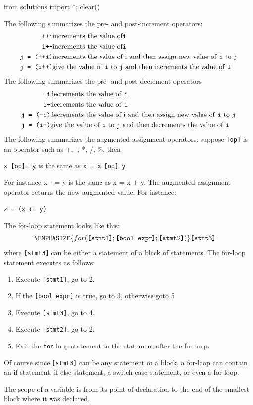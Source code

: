 \begin{python0}
from solutions import *; clear()
\end{python0}

The following summarizes the pre- and post-increment operators:
\begin{align*}
\texttt{++i} &\text{increments the value of} \texttt{i}\\
\texttt{i++} &\text{increments the value of} \texttt{i}\\
\texttt{j = (++i)} &\text{increments the value of i and then assign new value of
\texttt{i} to \texttt{j}}\\
\texttt{j = (i++)} &\text{give the value of \texttt{i} to \texttt{j} and then
increments the value of \texttt{I}}\\
\end{align*}
The following summarizes the pre- and post-decrement operators
\begin{align*}
\texttt{--i} &\text{decrements the value of \texttt{i}}\\
\texttt{i--} &\text{decrements the value of \texttt{i}}\\
\texttt{j = (--i)} &\text{decrements the value of i and then assign new value
of \texttt{i} to \texttt{j}}\\
\texttt{j = (i--)} &\text{give the value of \texttt{i} to \texttt{j} and then
decrements the value of \texttt{i}}\\
\end{align*}
The following summarizes the augmented assignment operators: suppose
\texttt{[op]} is an operator such as +, -, *, /, \%, then
\begin{center}
\texttt{x [op]= y}     is the same as      \texttt{x = x [op] y}
\end{center}
For instance x += y is the same as x = x + y. The augmented assignment
operator returns the new augmented value. For instance:
\begin{center}
\texttt{z = (x += y)}
\end{center}
The for-loop statement looks like this:
\begin{align*}
\EMPHASIZE{for (\texttt{[stmt1]}; \texttt{[bool expr]}; \texttt{[stmt2]})}
&\texttt{[stmt3]}
\end{align*}
where \texttt{[stmt3]} can be either a statement of a block of
statements. The for-loop statement executes as follows:

\begin{enumerate}
\item
  Execute \texttt{[stmt1]}, go to 2.
\item
  If the \texttt{[bool expr]} is true, go to 3, otherwise goto 5
\item
  Execute \texttt{[stmt3]}, go to 4.
\item
  Execute \texttt{[stmt2]}, go to 2.
\item
  Exit the \texttt{for}-loop statement to the statement after the for-loop.
\end{enumerate}

Of course since \texttt{[stmt3]} can be any statement or a block, a
for-loop can contain an if statement, if-else statement, a switch-case
statement, or even a for-loop.

The scope of a variable is from its point of declaration to the end of
the smallest block where it was declared.

